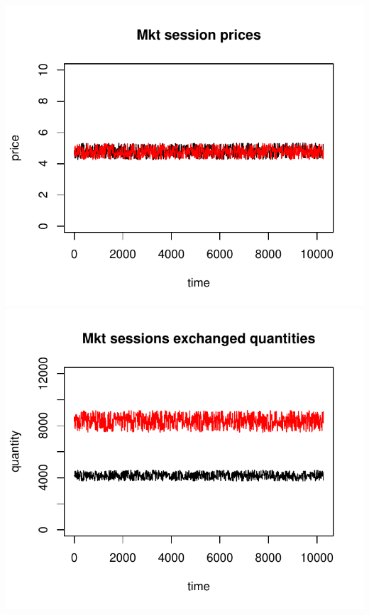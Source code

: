 \documentclass{article}
\begin{document}
\noindent
\vskip-5mm
\hskip-1cm
\includegraphics[scale=0.5]{fig_case02_prices}
\includegraphics[scale=0.5]{fig_case02_quantities}
\end{document}

